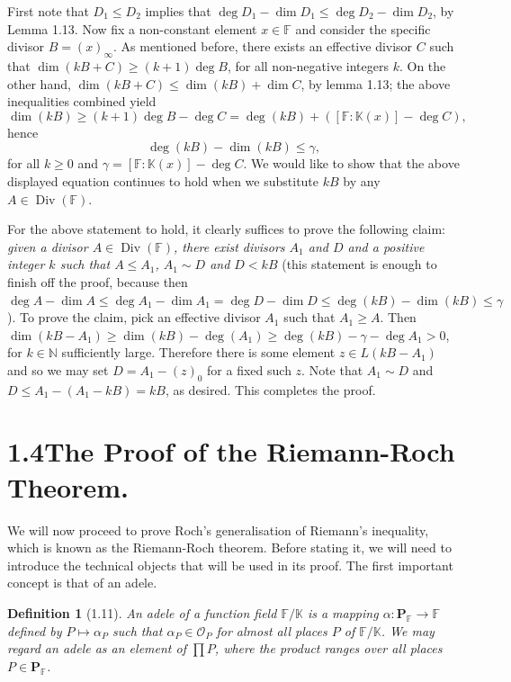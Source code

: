 \documentclass[11pt]{article}
\makeatletter
\theoremstyle{scplain}
\newtheorem*{definition}{Definition}
\renewenvironment{proof}[1][\proofname]{%
  \par\pushQED{\qed}\normalfont\topsep6\p@\@plus6\p@\relax
  \trivlist\item[\hskip\labelsep\scshape #1\@addpunct{.}]\ignorespaces}%
  {\popQED\endtrivlist\@endpefalse}
\DeclareMathOperator{\Div}{Div}
\makeatother
\begin{document}
\begin{proof}
First note that $D_1 \leq D_2$ implies that
$\deg D_1 - \dim D_1 \leq \deg D_2 - \dim D_2$, by Lemma 1.13. Now fix a
non-constant element $x \in \mathbb{F}$ and consider the specific divisor
$B = (x)_\infty$. As mentioned before, there exists an effective divisor $C$
such that $\dim(kB+C) \geq (k+1)\deg B$, for all non-negative integers $k$. On
the other hand, $\dim(kB+C) \leq \dim(kB)+\dim C$, by lemma 1.13; the above
inequalities combined yield
\[
  \dim(kB) \geq (k+1)\deg B - \deg C
    = \deg(kB) + ([\mathbb{F} : \mathbb{K}(x)] - \deg C),
\]
hence
\[
  \deg(kB) - \dim(kB) \leq \gamma,
\]
for all $k \geq 0$ and
$\gamma = [\mathbb{F} : \mathbb{K}(x)] - \deg C$. We would like to show that
the above displayed equation continues to hold when we substitute $kB$ by any
$A \in \Div(\mathbb{F})$.

For the above statement to hold, it clearly suffices to prove the following
claim: \emph{given a divisor $A \in \Div(\mathbb{F})$, there exist divisors $A_1$
and $D$ and a positive integer $k$ such that $A \leq A_1$, $A_1 \sim D$ and
$D < kB$} (this statement is enough to finish off the proof, because then
$\deg A - \dim A \leq \deg A_1 - \dim A_1 = \deg D - \dim D
\leq \deg(kB)-\dim(kB) \leq \gamma$). To prove the claim, pick an effective
divisor $A_1$ such that $A_1 \geq A$. Then
$\dim(kB-A_1) \geq \dim(kB)-\deg(A_1) \geq \deg(kB)-\gamma-\deg A_1 > 0$, for
$k \in \mathbb{N}$ sufficiently large. Therefore there is some element
$z \in L(kB-A_1)$ and so we may set $D = A_1-(z)_0$ for a fixed such $z$. Note
that $A_1 \sim D$ and $D \leq A_1-(A_1-kB)=kB$, as desired. This completes the
proof.
\end{proof}

\section*{1.4\quad The Proof of the Riemann-Roch Theorem.}

We will now proceed to prove Roch's generalisation of Riemann's inequality,
which is known as the Riemann-Roch theorem. Before stating it, we will need to
introduce the technical objects that will be used in its proof. The first
important concept is that of an adele.

\begin{definition}[1.11]
An adele of a function field $\mathbb{F}/\mathbb{K}$ is a mapping
$\alpha : \mathbf{P}_{\mathbb{F}} \longrightarrow \mathbb{F}$ defined by
$P \mapsto \alpha_P$ such that $\alpha_P \in \mathcal{O}_P$ for almost all
places $P$ of $\mathbb{F}/\mathbb{K}$. We may regard an adele as an element of
$\prod P$, where the product ranges over all places
$P \in \mathbf{P}_{\mathbb{F}}$.
\end{definition}
\end{document}

